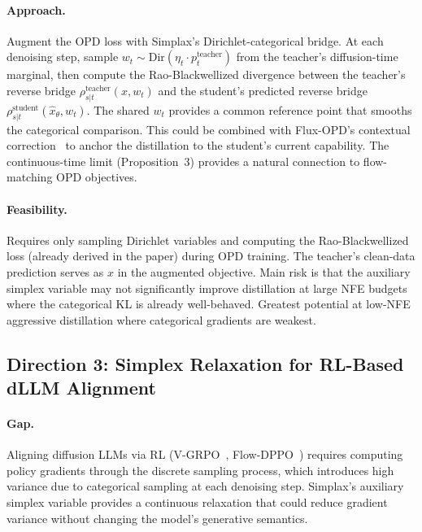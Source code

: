 \documentclass[11pt,a4paper]{article}
\begin{document}
\paragraph{Approach.} Augment the OPD loss with Simplax's Dirichlet-categorical bridge. At each denoising step, sample $w_t \sim \text{Dir}(\eta_t \cdot p_t^{\text{teacher}})$ from the teacher's diffusion-time marginal, then compute the Rao-Blackwellized divergence between the teacher's reverse bridge $\rho_{s|t}^{\text{teacher}}(x, w_t)$ and the student's predicted reverse bridge $\rho_{s|t}^{\text{student}}(\hat{x}_\theta, w_t)$. The shared $w_t$ provides a common reference point that smooths the categorical comparison. This could be combined with Flux-OPD's contextual correction~\cite{flux2026opd} to anchor the distillation to the student's current capability. The continuous-time limit (Proposition~3) provides a natural connection to flow-matching OPD objectives.

\paragraph{Feasibility.} Requires only sampling Dirichlet variables and computing the Rao-Blackwellized loss (already derived in the paper) during OPD training. The teacher's clean-data prediction serves as $x$ in the augmented objective. Main risk is that the auxiliary simplex variable may not significantly improve distillation at large NFE budgets where the categorical KL is already well-behaved. Greatest potential at low-NFE aggressive distillation where categorical gradients are weakest.

\subsection{Direction 3: Simplex Relaxation for RL-Based dLLM Alignment}

\paragraph{Gap.} Aligning diffusion LLMs via RL (V-GRPO~\cite{vgrpo2026}, Flow-DPPO~\cite{flowdppo2026}) requires computing policy gradients through the discrete sampling process, which introduces high variance due to categorical sampling at each denoising step. Simplax's auxiliary simplex variable provides a continuous relaxation that could reduce gradient variance without changing the model's generative semantics.
\end{document}
